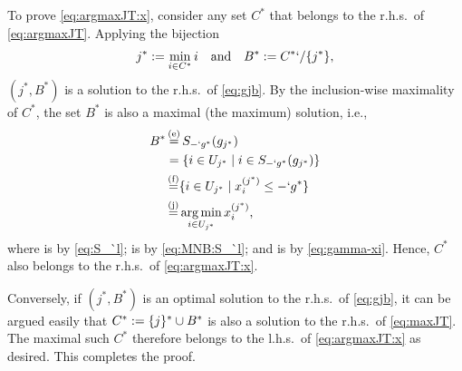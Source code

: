 \begin{Proof}
To prove \eqref{eq:argmaxJT:x}, consider any set $C^*$ that belongs to the r.h.s.\ of \eqref{eq:argmaxJT}. Applying the bijection
	\begin{align*}
	j^*:=\min_{i\in C^*} i
	\kern 1em \text {and}\kern1em B^*:=C^*`/\Set{j^*},
\end{align*}
$(j^*,B^*)$ is a solution to the r.h.s.\ of \eqref{eq:gjb}. By the inclusion-wise maximality of $C^*$, the set $B^*$ is also a maximal (the maximum) solution, i.e.,
\begin{align*}
	B^*&\utag{e}= S_{-`g^*}(g_{j^*})\\
	&= \Set {i\in U_{j^*}\mid i\in S_{-`g^*}(g_{j^*}) }\\
	&\utag{f}= \Set {i\in U_{j^*} \mid x^{(j^*)}_i \leq -`g^*}\\
	&\utag{j}= \argmin_{i\in U_{j^*}} x^{(j^*)}_i,
\end{align*}
where  is by \eqref{eq:S_`l};  is by \eqref{eq:MNB:S_`l}; and  is by
\eqref{eq:gamma-xi}. Hence, $C^*$ also belongs to the r.h.s.\ of \eqref{eq:argmaxJT:x}. 

Conversely, if $(j^*,B^*)$ is an optimal solution to the r.h.s.\ of \eqref{eq:gjb}, it can be argued
easily that $C^*:=\Set{j}^*\cup B^*$ is also a solution to the r.h.s.\ of \eqref{eq:maxJT}. The
maximal such $C^*$ therefore belongs to the l.h.s.\ of \eqref{eq:argmaxJT:x} as desired. This
completes the proof.
\end{Proof}



